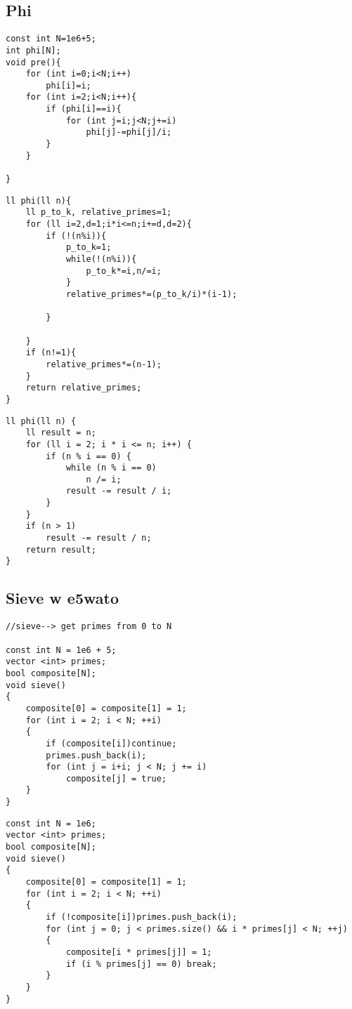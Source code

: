 \subsection{Phi}

\begin{lstlisting}[style=cpp]
const int N=1e6+5;
int phi[N];
void pre(){
    for (int i=0;i<N;i++)
        phi[i]=i;
    for (int i=2;i<N;i++){
        if (phi[i]==i){
            for (int j=i;j<N;j+=i)
                phi[j]-=phi[j]/i;
        }
    }

}
\end{lstlisting}

\begin{lstlisting}[style=cpp]
ll phi(ll n){
    ll p_to_k, relative_primes=1;
    for (ll i=2,d=1;i*i<=n;i+=d,d=2){
        if (!(n%i)){
            p_to_k=1;
            while(!(n%i)){
                p_to_k*=i,n/=i;
            }
            relative_primes*=(p_to_k/i)*(i-1);

        }

    }
    if (n!=1){
        relative_primes*=(n-1);
    }
    return relative_primes;
}
\end{lstlisting}

\begin{lstlisting}[style=cpp]
ll phi(ll n) {
    ll result = n;
    for (ll i = 2; i * i <= n; i++) {
        if (n % i == 0) {
            while (n % i == 0)
                n /= i;
            result -= result / i;
        }
    }
    if (n > 1)
        result -= result / n;
    return result;
}
\end{lstlisting}

\subsection{Sieve w e5wato}

\begin{lstlisting}[style=cpp]
//sieve--> get primes from 0 to N

const int N = 1e6 + 5;
vector <int> primes;
bool composite[N];
void sieve()
{
	composite[0] = composite[1] = 1;
	for (int i = 2; i < N; ++i)
	{
		if (composite[i])continue;
		primes.push_back(i);
		for (int j = i+i; j < N; j += i)
			composite[j] = true;
	}
}
\end{lstlisting}

\begin{lstlisting}[style=cpp]
const int N = 1e6;
vector <int> primes;
bool composite[N];
void sieve() 
{
	composite[0] = composite[1] = 1;
	for (int i = 2; i < N; ++i) 
	{
		if (!composite[i])primes.push_back(i);
		for (int j = 0; j < primes.size() && i * primes[j] < N; ++j)
		{
			composite[i * primes[j]] = 1;
			if (i % primes[j] == 0) break;
		}
	}
}
\end{lstlisting}

